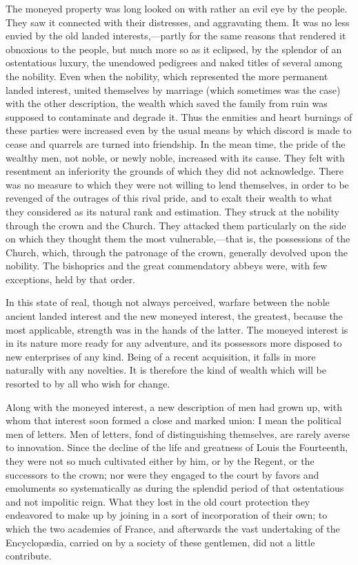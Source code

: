 The moneyed property was long looked on with rather an evil eye by the people. They saw it connected with their distresses, and aggravating them. It was no less envied by the old landed interests,—partly for the same reasons that rendered it obnoxious to the people, but much more so as it eclipsed, by the splendor of an ostentatious luxury, the unendowed pedigrees and naked titles of several among the nobility. Even when the nobility, which represented the more permanent landed interest, united themselves by marriage (which sometimes was the case) with the other description, the wealth which saved the family from ruin was supposed to contaminate and degrade it. Thus the enmities and heart burnings of these parties were increased even by the usual means by which discord is made to cease and quarrels are turned into friendship. In the mean time, the pride of the wealthy men, not noble, or newly noble, increased with its cause. They felt with resentment an inferiority the grounds of which they did not acknowledge. There was no measure to which they were not willing to lend themselves, in order to be revenged of the outrages of this rival pride, and to exalt their wealth to what they considered as its natural rank and estimation. They struck at the nobility through the crown and the Church. They attacked them particularly on the side on which they thought them the most vulnerable,—that is, the possessions of the Church, which, through the patronage of the crown, generally devolved upon the nobility. The bishoprics and the great commendatory abbeys were, with few exceptions, held by that order.

In this state of real, though not always perceived, warfare between the noble ancient landed interest and the new moneyed interest, the greatest, because the most applicable, strength was in the hands of the latter. The moneyed interest is in its nature more ready for any adventure, and its possessors more disposed to new enterprises of any kind. Being of a recent acquisition, it falls in more naturally with any novelties. It is therefore the kind of wealth which will be resorted to by all who wish for change.

Along with the moneyed interest, a new description of men had grown up, with whom that interest soon formed a close and marked union: I mean the political men of letters. Men of letters, fond of distinguishing themselves, are rarely averse to innovation. Since the decline of the life and greatness of Louis the Fourteenth, they were not so much cultivated either by him, or by the Regent, or the successors to the crown; nor were they engaged to the court by favors and emoluments so systematically as during the splendid period of that ostentatious and not impolitic reign. What they lost in the old court protection they endeavored to make up by joining in a sort of incorporation of their own; to which the two academies of France, and afterwards the vast undertaking of the Encyclopædia, carried on by a society of these gentlemen, did not a little contribute.

